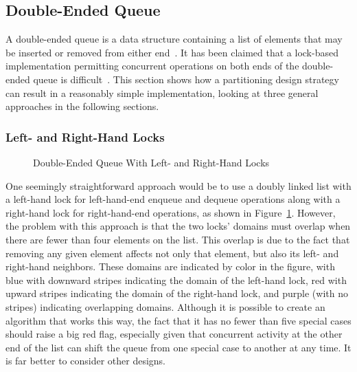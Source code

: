 \QuickQuizEnd

\subsection{Double-Ended Queue}
\label{sec:SMPdesign:Double-Ended Queue}

A double-ended queue is a data structure containing a list of elements
that may be inserted or removed from either end~\cite{Knuth73}.
It has been claimed that a lock-based implementation permitting
concurrent operations on both ends of the double-ended queue is
difficult~\cite{DanGrossman2007TMGCAnalogy}.
This section shows how a partitioning design strategy can result
in a reasonably simple implementation, looking at three
general approaches in the following sections.

\subsubsection{Left- and Right-Hand Locks}
\label{sec:SMPdesign:Left- and Right-Hand Locks}

\begin{figure}[tb]
\centering
{}
\caption{Double-Ended Queue With Left- and Right-Hand Locks}
\label{fig:SMPdesign:Double-Ended Queue With Left- and Right-Hand Locks}
\end{figure}

One seemingly straightforward approach would be to use a doubly
linked list with a left-hand lock
for left-hand-end enqueue and dequeue operations along with a right-hand
lock for right-hand-end operations, as shown in
Figure~\ref{fig:SMPdesign:Double-Ended Queue With Left- and Right-Hand Locks}.
However, the problem with this approach is that the two locks'
domains must overlap when there are fewer than four elements on the
list.
This overlap is due to the fact that removing any given element affects
not only that element, but also its left- and right-hand neighbors.
These domains are indicated by color in the figure, with blue
with downward stripes indicating
the domain of the left-hand lock, red with upward stripes
indicating the domain of the right-hand
lock, and purple (with no stripes) indicating overlapping domains.
Although it is possible to create an algorithm that works this way,
the fact that it has no fewer than five special cases should raise
a big red flag, especially given that concurrent activity at the other
end of the list can shift the queue from one special case to another
at any time.
It is far better to consider other designs.

